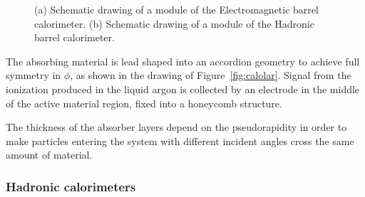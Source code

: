 \begin{figure}[tb]\begin{center}
	\caption{(a) Schematic drawing of a module of the Electromagnetic barrel calorimeter. 
        (b) Schematic drawing of a module of the Hadronic barrel calorimeter.}
\end{center}\end{figure}


The absorbing material is lead shaped into an accordion geometry to achieve
full symmetry in $\phi$, as shown in the drawing of Figure~\ref{fig:calolar}.
Signal from the ionization produced in the liquid argon is collected
by an electrode in the middle of the active material region, fixed into
a honeycomb structure.

The thickness of the absorber layers depend on the pseudorapidity in
order to make particles entering the system with different incident 
angles cross the same amount of material.

\subsubsection{Hadronic calorimeters}\label{sec:hadcal}

